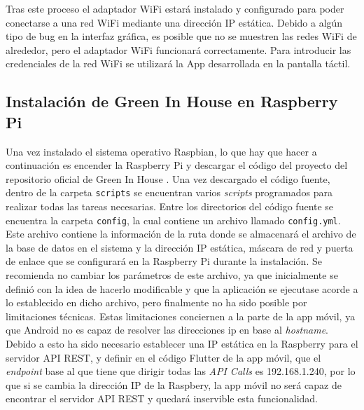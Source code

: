     Tras este proceso el adaptador WiFi estará instalado y configurado para poder conectarse a una red WiFi mediante una dirección IP estática. Debido a algún tipo de bug en la interfaz gráfica, es posible que no se muestren las redes WiFi de alrededor, pero el adaptador WiFi funcionará correctamente. Para introducir las credenciales de la red WiFi se utilizará la App desarrollada en la pantalla táctil.

    \subsection{Instalación de Green In House en Raspberry Pi}
    Una vez instalado el sistema operativo Raspbian, lo que hay que hacer a continuación es encender la Raspberry Pi y descargar el código del proyecto del repositorio oficial de Green In House \cite{GreenInHouse:repo:Maceta}. 
    Una vez descargado el código fuente, dentro de la carpeta \texttt{scripts} se encuentran varios \textit{scripts} programados para realizar todas las tareas necesarias. 
    Entre los directorios del código fuente se encuentra la carpeta \texttt{config}, la cual contiene un archivo llamado \texttt{config.yml}. Este archivo contiene la información de la ruta donde se almacenará el archivo de la base de datos en el sistema y la dirección IP estática, máscara de red y puerta de enlace que se configurará en la Raspberry Pi durante la instalación. Se recomienda no cambiar los parámetros de este archivo, ya que inicialmente se definió con la idea de hacerlo modificable y que la aplicación se ejecutase acorde a lo establecido en dicho archivo, pero finalmente no ha sido posible por limitaciones técnicas. Estas limitaciones conciernen a la parte de la app móvil, ya que Android no es capaz de resolver las direcciones ip en base al \textit{hostname}. Debido a esto ha sido necesario establecer una IP estática en la Raspberry para el servidor API REST, y definir en el código Flutter de la app móvil, que el \textit{endpoint} base al que tiene que dirigir todas las \textit{API Calls} es 192.168.1.240, por lo que si se cambia la dirección IP de la Raspbery, la app móvil no será capaz de encontrar el servidor API REST y quedará inservible esta funcionalidad.

